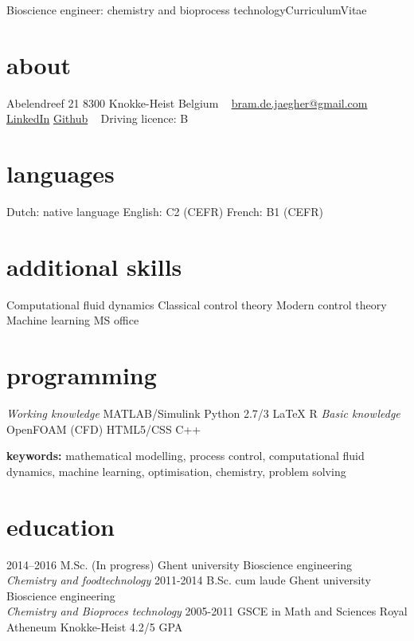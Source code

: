 \documentclass[]{friggeri-cv}
\begin{document}
       {Bioscience engineer: chemistry and bioprocess technology}{Curriculum}{Vitae}
\begin{aside}
  \section{about}
    Abelendreef 21
    8300 Knokke-Heist
    Belgium
    ~
    \href{mailto:bram.de.jaegher@gmail.com}{bram.de.jaegher@gmail.com}
    \href{http://be.linkedin.com/in/BramDeJaegher}{LinkedIn}
    \href{https://github.com/Beramos}{Github}
    ~
    Driving licence: B \vspace{-0.8mm}
  \section{languages}
    Dutch: native language
    English: C2 (CEFR)
    French:  B1  (CEFR) \vspace{3.3mm}
  \section{additional skills}
  Computational fluid dynamics
  Classical control theory 
  Modern control theory 
  Machine learning
  MS office \vspace{8mm}
  \section{programming} 
  \textit{Working knowledge}
  MATLAB/Simulink
  Python 2.7/3
  LaTeX
  R \vspace{0.1cm}
  \textit{Basic knowledge}
  OpenFOAM (CFD)
  HTML5/CSS
  C++
\end{aside}
\vspace{3mm}
\textbf{keywords:} mathematical modelling, process control, computational fluid dynamics, machine learning, optimisation, chemistry, problem solving
\vspace{3mm}

\section{education}
\begin{entrylist}
    \entry
    {2014–2016}
    {M.Sc. (In progress)}
    {Ghent university}
    {Bioscience engineering\\
    \emph{Chemistry and foodtechnology}}
  \entry
    {2011-2014}
    {B.Sc. cum laude}
    {Ghent university}
    {Bioscience engineering\\
    \emph{Chemistry and Bioproces technology}}
  \entry
    {2005-2011}
    {GSCE in Math and Sciences}
    {Royal Atheneum Knokke-Heist}
    {4.2/5 GPA}
\end{entrylist}
\end{document}
